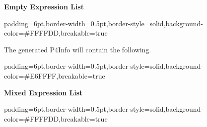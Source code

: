 \documentclass[11pt]{article}
\begin{document}
{%
\noindent{}\textbf{Empty Expression List}%

\begin{mdbmargintb}{6pt}{6pt}%
\begin{mdblock}{padding=6pt,border-width=0.5pt,border-style=solid,background-color=\#FFFFDD,breakable=true}%
\begin{mdpre}%
\end{mdpre}%
\end{mdblock}%
\end{mdbmargintb}%

\noindent{}The generated P4Info will contain the following.%

\begin{mdbmargintb}{6pt}{6pt}%
\begin{mdblock}{padding=6pt,border-width=0.5pt,border-style=solid,background-color=\#E6FFFF,breakable=true}%
\begin{mdpre}%
\end{mdpre}%
\end{mdblock}%
\end{mdbmargintb}%

\noindent{}\textbf{Mixed Expression List}%

\begin{mdbmargintb}{6pt}{6pt}%
\begin{mdblock}{padding=6pt,border-width=0.5pt,border-style=solid,background-color=\#FFFFDD,breakable=true}%
\begin{mdpre}%
\end{mdpre}%
\end{mdblock}%
\end{mdbmargintb}%

}
\end{document}
